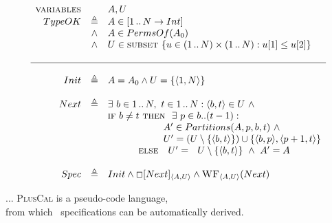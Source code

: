 {
\footnotesize
\begin{example}
\footnotesize
\[
\begin{array}{r c l}
\vspace{-20pt}\\
\kw{variables} & & A, U \\
TypeOK  & \triangleq &  A \in [1\, ..\, N \rightarrow Int] \\
& \wedge &  A \in PermsOf(A_0) \\
& \wedge & U \in \kw{subset}\ \{ u \in (1\, ..\, N) \times (1\, ..\, N) : u[1] \leq u[2] \} \\
%          
\\ \hline \\
%
Init & \triangleq &  A = A_0  \wedge  U = \{ \langle 1, N \rangle \} \\
\\ 
Next & \triangleq %
  &   \exists\ b \in 1\, ..\, N,\ t \in 1\, ..\, N : \langle b, t\rangle \in U \ \wedge \\
  & & \kw{if}\ b \neq t \
             \kw{then}\ \ \exists\ p \in b..(t-1) : \\
  & &    \hspace{58pt}      A' \in Partitions(A, p, b, t) \  \wedge \\
  & &    \hspace{58pt}      U' = (U \setminus \{\langle b, t\rangle \}) \cup \{\langle b, p\rangle, \langle p+1, t\rangle \} \\
  & & \hspace{32pt}  \kw{else}\ \ \  U' = \ \ U \setminus \{\langle b, t\rangle \}\  \wedge\  A' = A \\
\\                        
Spec & \triangleq & Init \wedge \Box[Next]_{\langle A, U \rangle} \wedge \kw{WF}_{\langle A, U\rangle}(Next) \\
\end{array}
\]
\end{example}
}

 {
 
... \textsc{PlusCal} is a pseudo-code language, \\ 
\vspace{25pt}
\hfill from which \tla\ specifications can be automatically derived.
\vspace{100pt}
}


